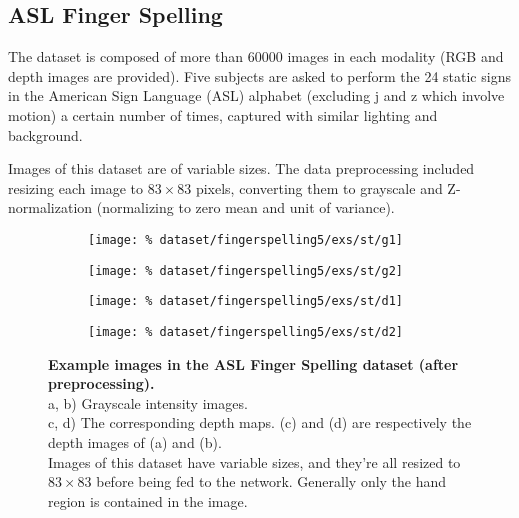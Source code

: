 \subsection{ASL Finger Spelling}

The dataset is composed of more than 60000 images in each modality
(RGB and depth images are provided).
Five subjects are asked to perform the 24 static signs in
the American Sign Language (ASL) alphabet (excluding j and z which involve
motion) a certain number of times, captured with similar lighting
and background.

Images of this dataset are of variable sizes. The data preprocessing
included resizing each image to $83 \times 83$ pixels,
converting them to grayscale and Z-normalization (normalizing to zero mean
and unit of variance).

\begin{figure}[H]
  \centering
  \hfill
  \begin{subfigure}{0.21\linewidth}
    \centering
    \texttt{[image: \%
      dataset/fingerspelling5/exs/st/g1]}
    \caption{}
  \end{subfigure}
  \hfill
  \begin{subfigure}{0.21\linewidth}
    \centering
    \texttt{[image: \%
      dataset/fingerspelling5/exs/st/g2]}
    \caption{}
  \end{subfigure}
  \hfill
  \begin{subfigure}{0.21\linewidth}
    \centering
    \texttt{[image: \%
      dataset/fingerspelling5/exs/st/d1]}
    \caption{}
  \end{subfigure}
  \hfill
  \begin{subfigure}{0.21\linewidth}
    \centering
    \texttt{[image: \%
      dataset/fingerspelling5/exs/st/d2]}
    \caption{}
  \end{subfigure}
  \caption{%
    \textbf{Example images in the ASL Finger Spelling dataset
      (after preprocessing).}\\[0.1em]
    a, b) Grayscale intensity images.\\[0.1em]
    c, d) The corresponding depth maps. (c) and (d) are respectively the
      depth images of (a) and (b).\\[0.1em]
    Images of this dataset have variable sizes, and they're all resized to
      $83 \times 83$ before being fed to the network. Generally only the
      hand region is contained in the image.}
  \label{fig:fingerspelling_exs}
\end{figure}

